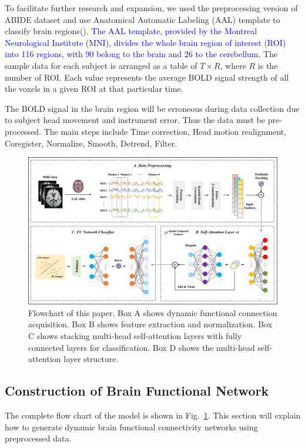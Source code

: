 \documentclass[a4paper]{cas-dc}
\newcommand{\figref}[1]{Fig.~\ref{#1}}
\begin{document}
To facilitate further research and expansion, we used the preprocessing version of ABIDE dataset and use Anatomical Automatic Labeling (AAL) template to classify brain regions(\cite{rolls2015implementation}). \textcolor{blue}{The AAL template, provided by the Montreal Neurological Institute (MNI), divides the whole brain region of interest (ROI) into 116 regions, with 90 belong to the brain and 26 to the cerebellum.} The sample data for each subject is arranged as a table of $T\times R$, where $R$ is the number of ROI. Each value represents the average BOLD signal strength of all the voxels in a given ROI at that particular time.

The BOLD signal in the brain region will be erroneous during data collection due to subject head movement and instrument error. Thus the data must be pre-processed. The main steps include Time correction, Head motion realignment, Coregister, Normalize, Smooth, Detrend, Filter.

\begin{figure}[t]
	\centering
	\includegraphics[width=\textwidth]{imgs/model.png}
	\caption{Flowchart of this paper. Box A shows dynamic functional connection acquisition. Box B shows feature extraction and normalization. Box C shows stacking multi-head self-attention layers with fully connected layers for classification. Box D shows the multi-head self-attention layer structure.}
	\label{fig1}
\end{figure} 

\subsection{Construction of Brain Functional Network}
The complete flow chart of the model is shown in \figref{fig1}. This section will explain how to generate dynamic brain functional connectivity networks using preprocessed data. 
\end{document}
